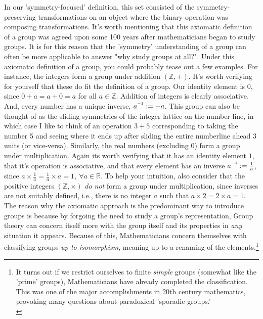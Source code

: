 \documentclass[11pt,a4paper]{article}
\newcommand{\inv}{^{\raisebox{.2em}{$\scriptscriptstyle-1$}}}
\newcommand{\reals}{\mathbb{R}}
\begin{document}
In our 'symmetry-focused' definition, this set consisted of the symmetry-preserving transformations on an object where the binary operation was composing transformations. It's worth mentioning that this axiomatic definition of a group was agreed upon some 100 years after mathematicians began to study groups. It is for this reason that the 'symmetry' understanding of a group can often be more applicable to answer "why study groups at all?". Under this axiomatic definition of a group, you could probably tease out a few examples. For instance, the integers form a group under addition $(\mathbb{Z}, +)$. It's worth verifying for yourself that these do fit the definition of a group. Our identity element is 0, since $0 + a = a + 0 = a$ for all $a \in \mathbb{Z}$. Addition of integers is clearly associative. And, every number has a unique inverse, $a\inv := -a$. This group can also be thought of as the sliding symmetries of the integer lattice on the number line, in which case I like to think of an operation $3+5$ corresponding to taking the number 5 and seeing where it ends up after sliding the entire numberline ahead 3 units (or vice-versa). Similarly, the real numbers (excluding 0) form a group under multiplication. Again its worth verifying that it has an identity element $1$, that it's operation is associative, and that every element has an inverse $a\inv := \frac{1}{a}$, since $a\times \frac{1}{a} = \frac{1}{a} \times a = 1, \ \forall  a \in \reals$. To help your intuition, also consider that the positive integers $(\mathbb{Z},\times)$  \textit{do not} form a group under multiplication, since inverses are not suitably defined, i.e., there is no integer $a$ such that $a\times 2 = 2 \times a = 1$.
  The reason why the axiomatic approach is the predominant way to introduce groups is because by forgoing the need to study a group's representation, Group theory can concern itself more with the group itself and its properties in \textit{any} situation it appears. Because of this, Mathematicians concern themselves with classifying groups \textit{up to isomorphism}, meaning up to a renaming of the elements.\footnote[2]{It turns out if we restrict ourselves to finite \textit{simple} groups (somewhat like the 'prime' groups), Mathematicians have already completed the classification. This was one of the major accomplishments in 20th century mathematics, provoking many questions about paradoxical 'sporadic groups.'\\\autocite{aschbacher}}
\end{document}
